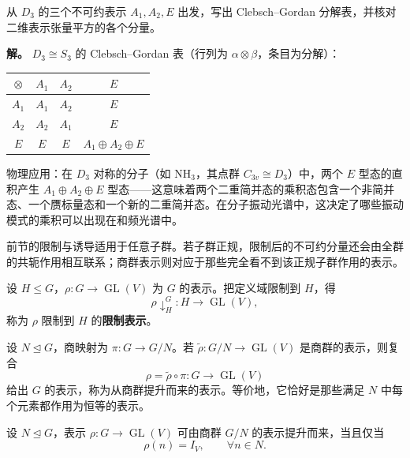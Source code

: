 \begin{example}
从 $D_3$ 的三个不可约表示 $A_1,A_2,E$ 出发，写出 Clebsch--Gordan 分解表，并核对二维表示张量平方的各个分量。

\textbf{解。} $D_3\cong S_3$ 的 Clebsch--Gordan 表（行列为 $\alpha\otimes\beta$，条目为分解）：
\begin{center}
\begin{tabular}{c|ccc}
\toprule
$\otimes$ & $A_1$ & $A_2$ & $E$ \\
\midrule
$A_1$ & $A_1$ & $A_2$ & $E$ \\
$A_2$ & $A_2$ & $A_1$ & $E$ \\
$E$ & $E$ & $E$ & $A_1\oplus A_2\oplus E$ \\
\bottomrule
\end{tabular}
\end{center}
物理应用：在 $D_3$ 对称的分子（如 $\mathrm{NH_3}$，其点群 $C_{3v}\cong D_3$）中，两个 $E$ 型态的直积产生 $A_1\oplus A_2\oplus E$ 型态——这意味着两个二重简并态的乘积态包含一个非简并态、一个赝标量态和一个新的二重简并态。在分子振动光谱中，这决定了哪些振动模式的乘积可以出现在和频光谱中。
\end{example}

前节的限制与诱导适用于任意子群。若子群正规，限制后的不可约分量还会由全群的共轭作用相互联系；商群表示则对应于那些完全看不到该正规子群作用的表示。

\begin{definition}[限制表示]
设 $H\leqslant G$，$\rho:G\to\operatorname{GL}(V)$ 为 $G$ 的表示。把定义域限制到 $H$，得
\[
\rho\downarrow_H^G:H\to\operatorname{GL}(V),
\]
称为 $\rho$ 限制到 $H$ 的\textbf{限制表示}。
\label{def:restricted-representation}
\end{definition}

\begin{definition}[由商群提升的表示]
设 $N\mathrel{\trianglelefteq} G$，商映射为 $\pi:G\to G/N$。若 $\widetilde\rho:G/N\to\operatorname{GL}(V)$ 是商群的表示，则复合
\[
\rho=\widetilde\rho\circ\pi:G\to\operatorname{GL}(V)
\]
给出 $G$ 的表示，称为从商群提升而来的表示。等价地，它恰好是那些满足 $N$ 中每个元素都作用为恒等的表示。
\label{def:quotient-lift}
\end{definition}

\begin{proposition}[商群表示的判据]
设 $N\mathrel{\trianglelefteq} G$，表示 $\rho:G\to\operatorname{GL}(V)$ 可由商群 $G/N$ 的表示提升而来，当且仅当
\[
\rho(n)=I_V,
\qquad \forall n\in N.
\]
\label{prop:quotient-representation-criterion}

\end{proposition}

